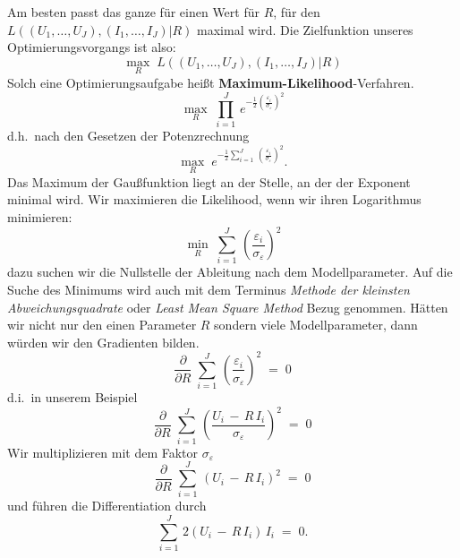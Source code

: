 Am besten passt das ganze für einen Wert für $R$,
für den $L((U_1,\dots, U_J), (I_1,\dots,I_J) | R)$ maximal wird.
Die Zielfunktion unseres Optimierungsvorgangs ist also:
\begin{equation}
\max_{R} \; L((U_1,\dots, U_J), (I_1,\dots,I_J) | R)
\end{equation}
Solch eine Optimierungsaufgabe heißt \textbf{Maximum-Likelihood}-Verfahren.
\begin{equation}
\max_{R} \; \prod\limits_{i = 1}^J \,  e^{-\frac{1}{2} \left(\frac{\varepsilon_i}{\sigma_\varepsilon}\right)^2}
\label{MaxiLikeR1}
\end{equation}
d.h.\ nach den Gesetzen der Potenzrechnung
\begin{equation}
\max_{R} \; e^{-\frac{1}{2} \sum\limits_{i = 1}^J \, \left(\frac{\varepsilon_i}{\sigma_\varepsilon}\right)^2} .
\label{MaxiLikeR2}
\end{equation}
Das Maximum der Gaußfunktion liegt an der Stelle, an der der Exponent minimal wird.
Wir maximieren die Likelihood, wenn wir ihren Logarithmus minimieren:
\begin{equation}
\min_{R} \; \sum_{i = 1}^J \, \left(\frac{\varepsilon_i}{\sigma_\varepsilon}\right)^2
\label{MaxiLikeLSQ}
\end{equation}
dazu suchen wir die Nullstelle der Ableitung nach dem Modellparameter.
Auf die Suche des Minimums wird auch mit dem Terminus \textsl{Methode der kleinsten Abweichungsquadrate} oder
\textsl{Least Mean Square Method} Bezug genommen.
Hätten wir nicht nur den einen Parameter $R$ sondern viele Modellparameter,
dann würden wir den Gradienten bilden.
\begin{equation}
\frac{\partial}{\partial R} \; \sum_{i = 1}^J \, \left(\frac{\varepsilon_i}{\sigma_\varepsilon}\right)^2 \; = \; 0
\end{equation}
d.i.\ in unserem Beispiel
\begin{equation}
\frac{\partial}{\partial R} \; \sum_{i = 1}^J \, \left(\frac{U_i \, - \, R \, I_i}{\sigma_\varepsilon}\right)^2 \; = \; 0
\end{equation}
Wir multiplizieren mit dem Faktor $\sigma_\varepsilon$
\begin{equation}
\frac{\partial}{\partial R} \; \sum_{i = 1}^J \, \left(U_i \, - \, R \, I_i\right)^2 \; = \; 0
\end{equation}
und führen die Differentiation durch
\begin{equation}
\sum_{i = 1}^J \, 2 \left(U_i \, - \, R \, I_i\right) \, I_i \; = \; 0 .
\end{equation}

